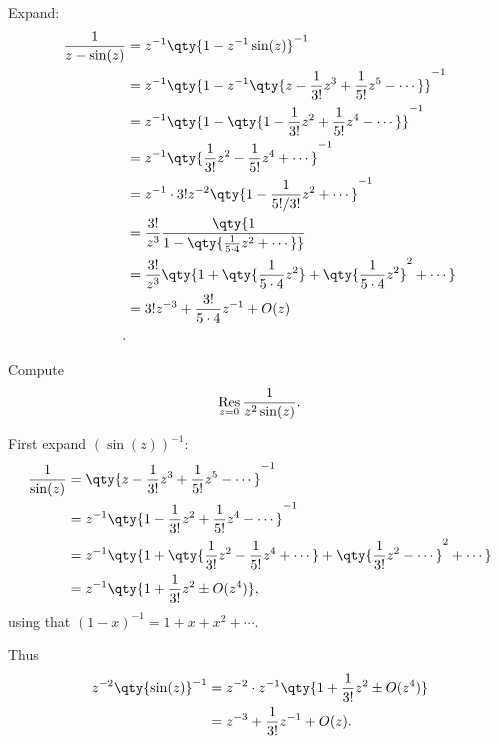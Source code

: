 \begin{solution}

Expand:
\begin{align*}
{1\over z - \sin(z)}
&= z^{-1}\qty{1 - z^{-1}\sin(z) }^{-1}\\
&= z^{-1}\qty{1 - z^{-1}\qty{ z - {1\over 3!}z^3 + {1\over 5!} z^5 - \cdots}}^{-1}\\
&= z^{-1}\qty{1 - \qty{ 1 - {1\over 3!}z^2 + {1\over 5!} z^4 - \cdots}}^{-1}\\
&= z^{-1}\qty{{1\over 3!}z^2 - {1\over 5!}z^4 + \cdots}^{-1}\\
&= z^{-1}\cdot 3! z^{-2} \qty{1 - {1\over 5!/3!}z^2 + \cdots}^{-1}\\
&= {3!\over z^3} \qty{1 \over 1 - \qty{ {1\over 5\cdot 4}z^2 + \cdots}} \\
&= {3!\over z^3}\qty{1 + \qty{{1\over 5\cdot 4}z^2} + \qty{{1\over 5\cdot 4}z^2}^2 + \cdots} \\
&= 3! z^{-3} + {3!\over 5\cdot 4}z^{-1}+ O(z) \\
.\end{align*}

\end{solution}

\begin{exercise}[?]

Compute
\begin{align*}
\mathop{\mathrm{Res}}_{z=0} {1\over z^2 \sin(z)}
.\end{align*}

\end{exercise}

\begin{solution}

First expand \((\sin(z))^{-1}\):
\begin{align*}
{1\over \sin(z)}
&= \qty{z - {1\over 3!}z^3 + {1\over 5!}z^5 -\cdots }^{-1}\\
&= z^{-1}\qty{1 - {1\over 3!}z^2 + {1\over 5!}z^4 - \cdots }^{-1}\\
&= z^{-1}\qty{1 + 
\qty{{1\over 3!}z^2 - {1\over 5!} z^4 + \cdots} 
+
\qty{{1\over 3!}z^2 - \cdots}^2 + \cdots
} \\
&= z^{-1}\qty{1 + {1\over 3!}z^2 \pm O(z^4) }
,\end{align*}
using that \((1-x)^{-1}= 1 + x + x^2 + \cdots\).

Thus
\begin{align*}
z^{-2}\qty{\sin(z)}^{-1}
&= z^{-2} \cdot
z^{-1}\qty{1 + {1\over 3!}z^2 \pm O(z^4) } \\
&= z^{-3} + {1\over 3!}z^{-1}+ O(z)
.\end{align*}

\end{solution}

